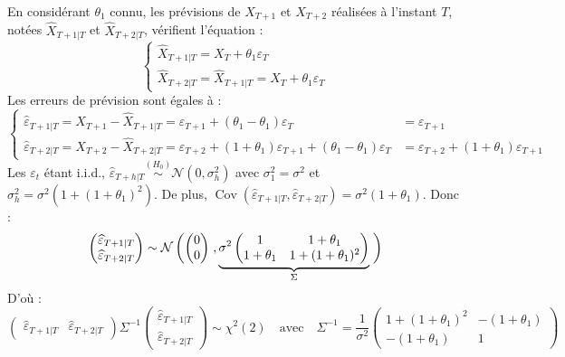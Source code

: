 \documentclass[french]{article}
\DeclareMathOperator{\Cov}{Cov}
\begin{document}
En considérant \(\theta_1\) connu, les prévisions de \(X_{T+1}\) et \(X_{T+2}\) réalisées à l'instant \(T\), notées \(\widehat X_{T+1\vert T}\) et \(\widehat X_{T+2\vert T}\), vérifient l'équation :
\[
\begin{cases}
\widehat X_{T+1\vert T}= X_T + \theta_1\varepsilon_T \\
\widehat X_{T+2\vert T}=\widehat X_{T+1\vert T} =  X_T + \theta_1\varepsilon_T 
\end{cases}
\]
Les erreurs de prévision sont égales à :
\[
\begin{cases}
\widehat \varepsilon_{T+1\vert T} = X_{T+1} - \widehat X_{T+1\vert T}=
\varepsilon_{T+1}+(\theta_1-\theta_1)\varepsilon_T 
&= \varepsilon_{T+1}
\\
\widehat \varepsilon_{T+2\vert T} = X_{T+2} - \widehat X_{T+2\vert T}=
\varepsilon_{T+2}+(1+\theta_1)\varepsilon_{T+1}+(\theta_1-\theta_1)\varepsilon_T 
&=
\varepsilon_{T+2}+(1+\theta_1)\varepsilon_{T+1}
\end{cases}
\]
Les \(\varepsilon_t\) étant i.i.d., \(\widehat \varepsilon_{T+h\vert T} \overset{(H_0)}{\sim}\mathcal N(0,\sigma_h^2)\) avec \(\sigma_1^2=\sigma^2\) et \(\sigma_h^2=\sigma^2(1+(1+\theta_1)^2)\).
De plus, \(\Cov(\widehat \varepsilon_{T+1\vert T},\widehat \varepsilon_{T+2\vert T})=\sigma^2(1+\theta_1)\). Donc :
\[
\begin{pmatrix}
    \widehat \varepsilon_{T+1\vert T} \\ \widehat \varepsilon_{T+2\vert T}
\end{pmatrix} \sim
\mathcal N \left(
\begin{pmatrix}
    0 \\ 0
\end{pmatrix}\right.,
\underbrace{
\sigma^2 
\begin{pmatrix}
    1 & 1+\theta_1\\ 1+\theta_1 & 1+ (1+\theta_1)^2
\end{pmatrix}}_{\Sigma}\left.\mathclap{\phantom{\begin{pmatrix} 0\\0 \end{pmatrix}}}
\right)
\]
D'où :
\[
\begin{pmatrix}
    \widehat \varepsilon_{T+1\vert T} & \widehat \varepsilon_{T+2\vert T}
\end{pmatrix}
\Sigma^{-1}
\begin{pmatrix}
    \widehat \varepsilon_{T+1\vert T} \\ \widehat \varepsilon_{T+2\vert T}
\end{pmatrix}\sim{\chi}^2(2) 
\quad\text{avec}\quad
\Sigma^{-1} = 
\frac{1}{\sigma^2}
\begin{pmatrix}
     1+(1+\theta_1)^2 & - (1+\theta_1) \\ -(1+\theta_1) &1
\end{pmatrix}
\]
\end{document}
